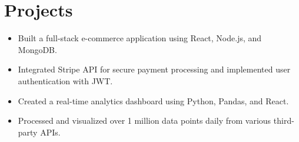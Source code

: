 \section{Projects}

\begin{itemize}[leftmargin=*, noitemsep]
    \item Built a full-stack e-commerce application using React, Node.js, and MongoDB.
    \item Integrated Stripe API for secure payment processing and implemented user authentication with JWT.
\end{itemize}

\vspace{6pt}

\begin{itemize}[leftmargin=*, noitemsep]
    \item Created a real-time analytics dashboard using Python, Pandas, and React.
    \item Processed and visualized over 1 million data points daily from various third-party APIs.
\end{itemize}
